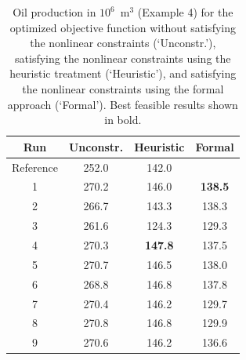 \documentclass[twocolumn,numbook]{svjour3}          %
\begin{document}
\begin{table}
\centering
\caption{Oil production in $10^6$~m$^3$ (Example 4) for the optimized objective function
         without satisfying the nonlinear constraints (`Unconstr.'), satisfying the nonlinear constraints
         using the heuristic treatment (`Heuristic'), and satisfying the nonlinear constraints
         using the formal approach (`Formal'). Best feasible results shown in bold.}
\begin{tabular}{|c|c|c|c|}
\hline
Run               & Unconstr. & Heuristic & Formal  \\
\hline
Reference         & 252.0         & 142.0          &             \\
1  & 270.2            & 146.0          & \bf{138.5}        \\
2  & 266.7            & 143.3          & 138.3    \\
3  & 261.6            & 124.3          & 129.3          \\
4  & 270.3            & \bf{147.8}   & 137.5         \\
5  & 270.7            & 146.5          & 138.0    \\
6  & 268.8            & 146.8          & 137.8 \\
7  & 270.4            & 146.2          & 129.7         \\
8  & 270.8            & 146.8          & 129.9      \\
9  & 270.6            & 146.2          & 136.6       \\
\hline
\end{tabular}
  \label{table:Norne}
\end{table}

\end{document}
